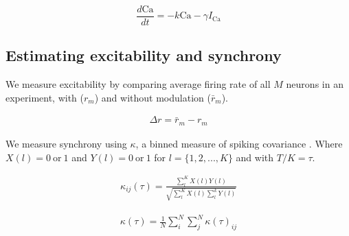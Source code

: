 \documentclass{article}
\begin{document}
\begin{equation}
\label{eq:passive}
\frac{d\text{Ca}}{dt} = -k \text{Ca} - \gamma I_\text{Ca}
\end{equation}

\subsection*{Estimating excitability and synchrony}
We measure excitability by comparing average firing rate of all $M$ neurons in an experiment, with ($r_m$) and without modulation ($\bar{r}_m$). 

\begin{align}
    \label{eq:excite}
    \Delta r = \bar{r}_m - r_m
\end{align}

We measure synchrony using $\kappa$, a binned measure of spiking covariance \cite{Wang1996}. Where $X(l) = 0 \ \text{or} \ 1$ and $Y(l) = 0 \ \text{or} \ 1$ for $l = \{1, 2, ..., K \}$ and with $T/K = \tau$.

\begin{align}
    \label{eq:kappa}
    \kappa_{ij}(\tau) = \frac{\sum_l^K X(l)Y(l)}{\sqrt{\sum_l^K X(l) \sum_l^k Y(l)}}
\end{align}

\begin{align}
\kappa(\tau) = \frac{1}{N} \sum_i^N \sum_j^N \kappa(\tau)_{ij}
\end{align}


\end{document}
